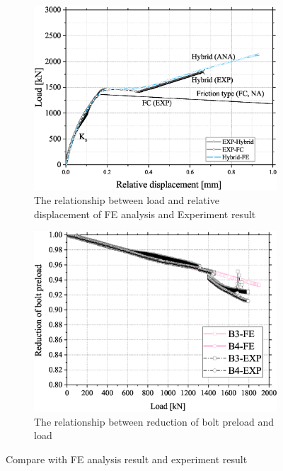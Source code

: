 \begin{figure}
    \centering
    \begin{subfigure}[b]{0.48\linewidth}
        \includegraphics[width=\linewidth]{imgs/ch7/valid-rd.eps}
        \caption{The relationship between load and relative displacement of FE analysis and Experiment result}
        \label{fig-valid-rd}
    \end{subfigure}
    \hfill
    \begin{subfigure}[b]{0.48\linewidth}
    \centering
        \includegraphics[width=\linewidth]{imgs/ch7/valid-boltAF.eps}
        \caption{The relationship between reduction of bolt preload and load}
        \label{fig-valid-redc}
    \end{subfigure}
    
    \caption{Compare with FE analysis result and experiment result \cite{chen2024Exp} }
    \label{fig-valid}
\end{figure}


